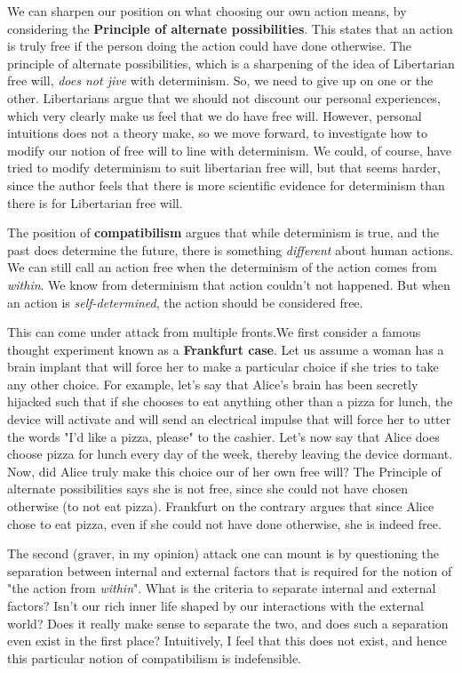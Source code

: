 \documentclass{article}
\begin{document}
We can sharpen our position on what choosing our own action means, by
considering the \textbf{Principle of alternate possibilities}. This states that
an action is truly free if the person doing the action could have done
otherwise.  The principle of alternate possibilities, which is a sharpening of
the idea of Libertarian free will, \emph{does not jive} with determinism. So,
we need to give up on one or the other. Libertarians argue that we should not
discount our personal experiences, which very clearly make us feel that we do
have free will. However, personal intuitions does not a theory make, so we move
forward, to investigate how to modify our notion of free will to line with
determinism. We could, of course, have tried to modify determinism to suit
libertarian free will, but that seems harder, since the author feels that there
is more scientific evidence for determinism than there is for Libertarian free
will.

The position of \textbf{compatibilism} argues that while determinism is true,
and the past does determine the future, there is something \emph{different}
about human actions. We can still call an action free when the determinism of
the action comes from \emph{within}. We know from determinism that action
couldn't not happened. But when an action is \emph{self-determined}, the action
should be considered free.


This can come under attack from multiple fronts.We first consider a famous thought
experiment known as a \textbf{Frankfurt case}. Let us assume a woman has a brain
implant that will force her to make a particular
choice if she tries to take any other choice. For example, let's say that Alice's
brain has been secretly hijacked such that if she chooses to eat anything other
than a pizza for lunch, the device will activate and will send an electrical impulse
that will force her to utter the words "I'd like a pizza, please" to the cashier.
Let's now say that Alice does choose pizza for lunch every day of the week,
thereby leaving the device dormant. Now, did Alice truly make this choice our
of her own free will? The Principle of alternate possibilities says she is not
free, since she could not have chosen otherwise (to not eat pizza).
Frankfurt on the contrary argues that since Alice chose to eat pizza, even if she
could not have done otherwise, she is indeed free.

The second (graver, in my opinion) attack one can mount is by questioning
the separation between internal and external factors that is required for 
the notion of "the action from \emph{within}". What is the criteria to separate
internal and external factors? Isn't our rich inner life shaped by our interactions
with the external world? Does it really make sense to separate the two, and
does such a separation even exist in the first place? Intuitively, I feel
that this does not exist, and hence this particular notion of compatibilism is
indefensible.
\end{document}
